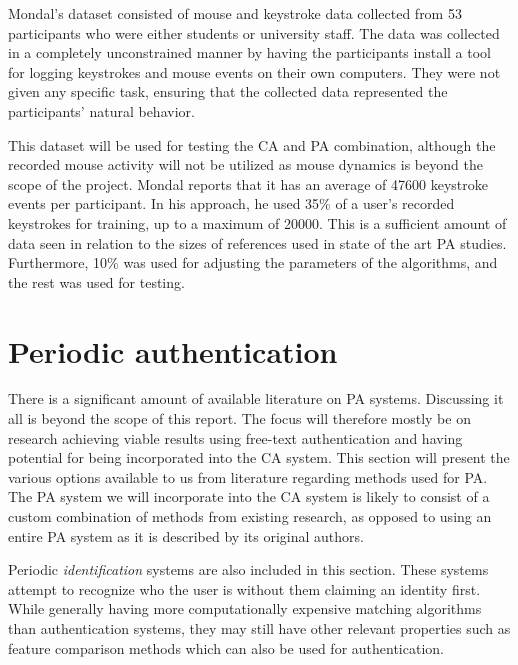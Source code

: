 Mondal's dataset consisted of mouse and keystroke data collected from 53 participants who were either students or university staff.
The data was collected in a completely unconstrained manner by having the participants install a tool for logging keystrokes and mouse events on their own computers.
They were not given any specific task, ensuring that the collected data represented the participants' natural behavior.

This dataset will be used for testing the CA and PA combination, although the recorded mouse activity will not be utilized as mouse dynamics is beyond the scope of the project.
Mondal reports that it has an average of 47600 keystroke events per participant. 
In his approach, he used 35\% of a user's recorded keystrokes for training, up to a maximum of 20000.
This is a sufficient amount of data seen in relation to the sizes of references used in state of the art PA studies.
Furthermore, 10\% was used for adjusting the parameters of the algorithms, and the rest was used for testing.


\section{Periodic authentication}
\label{sec:related-other}
There is a significant amount of available literature on PA systems.
Discussing it all is beyond the scope of this report. The focus will therefore mostly be on research achieving viable results using free-text authentication and having potential for being incorporated into the CA system.
This section will present the various options available to us from literature regarding methods used for PA.
The PA system we will incorporate into the CA system is likely to consist of a custom combination of methods from existing research, as opposed to using an entire PA system as it is described by its original authors.

Periodic \textit{identification} systems are also included in this section.
These systems attempt to recognize who the user is without them claiming an identity first.
While generally having more computationally expensive matching algorithms than authentication systems, they may still have other relevant properties such as feature comparison methods which can also be used for authentication.

